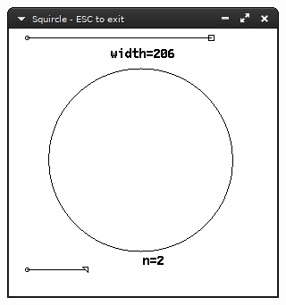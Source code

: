 \documentclass[12pt,openany,a4,usenames,dvipsnames]{book}
\begin{document}
\begin{figure}[H]
\begin{minipage}{0.49\textwidth}
    \includegraphics[width=\textwidth,keepaspectratio]{figures/squircle_2.png}
  \end{minipage}
\end{figure}
\end{document}
